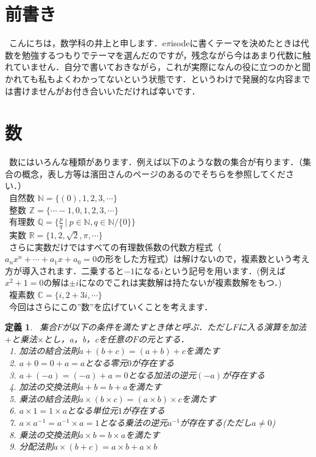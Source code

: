 \documentclass[./main]{subfiles} %
\theoremstyle{idefinition}
\newtheorem{idefi}{定義}[section]
\begin{document}

\section{前書き}
\ こんにちは，数学科の井上と申します．e$\pi$isodeに書くテーマを決めたときは代数を勉強するつもりでテーマを選んだのですが，残念ながら今はあまり代数に触れていません．自分で書いておきながら，これが実際になんの役に立つのかと聞かれても私もよくわかってないという状態です．というわけで発展的な内容までは書けませんがお付き合いいただければ幸いです．\\

\section{数}
\ 数にはいろんな種類があります．例えば以下のような数の集合が有ります．（集合の概念，表し方等は濱田さんのページのあるのでそちらを参照してください．）\\
\ 自然数 $\mathbb{N} = \{(0),1,2,3,\cdots \}$\\
\ 整数 $\mathbb{Z} = \{\cdots-1,0,1,2,3,\cdots \}$\\
\ 有理数 $\mathbb{Q} = \{\frac{p}{q}\ |\ p\in \mathbb{N},q\in\mathbb{N}/\{ 0\} \}$\\
\ 実数 $\mathbb{R}=\{1,2,\sqrt{2},\pi,\cdots \}$\\
\ さらに実数だけではすべての有理数係数の代数方程式（$a_nx^n+\cdots +a_1x+a_0=0$の形をした方程式）は解けないので，複素数という考え方が導入されます．二乗すると$-1$になる$i$という記号を用います．(例えば$x^2+1=0$の解は$\pm i$になのでこれは実数解は持たないが複素数解をもつ．)\\
\ 複素数 $\mathbb{C}=\{i ,2+3i ,\cdots \}$\\
\ 今回はさらにこの''数''を広げていくことを考えます．\\

\begin{idefi} 
\ 集合$F$が以下の条件を満たすとき体と呼ぶ．ただし$F$に入る演算を加法$+$と乗法$\times$とし，a，b，cを任意の$F$の元とする．\\
\ 1. 加法の結合法則$a+(b+c)=(a+b)+c$を満たす\\
\ 2. $a+0=0+a=a$となる零元$0$が存在する\\
\ 3. $a+(-a)=(-a)+a=0$となる加法の逆元$(-a)$が存在する\\
\ 4. 加法の交換法則$a+b=b+a$を満たす\\
\ 5. 乗法の結合法則$a\times(b\times c)=(a\times b)\times c$を満たす\\
\ 6. $a\times1=1\times a$となる単位元$1$が存在する\\
\ 7. $a\times a^{-1}=a^{-1} \times a=1$となる乗法の逆元$a^{-1}$が存在する(ただし$a\neq 0$)\\
\ 8. 乗法の交換法則$a\times b=b\times a$を満たす\\
\ 9. 分配法則$a\times(b+c)=a\times b+a \times b$
\end{idefi} 
\end{document}
